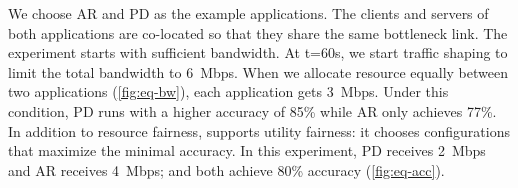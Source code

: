 We choose AR and PD as the example applications.  The clients and servers of
both applications are co-located so that they share the same bottleneck
link. The experiment starts with sufficient bandwidth. At t=60s, we start
traffic shaping to limit the total bandwidth to \SI{6}{Mbps}. When we allocate
resource equally between two applications (\autoref{fig:eq-bw}), each
application gets \SI{3}{Mbps}. Under this condition, PD runs with a higher
accuracy of 85\% while AR only achieves 77\%. In addition to resource fairness,
\sysname{} supports utility fairness: it chooses configurations that maximize
the minimal accuracy. In this experiment, PD receives \SI{2}{Mbps} and AR
receives \SI{4}{Mbps}; and both achieve 80\% accuracy (\autoref{fig:eq-acc}).


